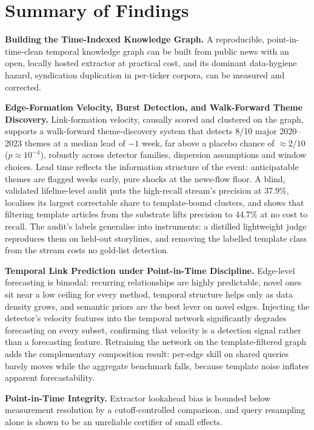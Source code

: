 \documentclass[a4paper,12pt]{report}
\begin{document}
\section{Summary of Findings}
\textbf{Building the Time-Indexed Knowledge Graph.} A reproducible,
point-in-time-clean temporal knowledge graph can be built from public news
with an open, locally hosted extractor at practical cost, and its dominant
data-hygiene hazard, syndication duplication in per-ticker corpora, can
be measured and corrected.

\textbf{Edge-Formation Velocity, Burst Detection, and Walk-Forward Theme
Discovery.} Link-formation velocity, causally scored and clustered on the graph, supports
a walk-forward theme-discovery system that detects 8/10 major 2020--2023
themes at a median lead of $-1$ week, far above a placebo chance of
$\approx 2/10$ ($p \approx 10^{-4}$), robustly across detector families,
dispersion assumptions and window choices. Lead time reflects the information
structure of the event: anticipatable themes are flagged weeks early, pure
shocks at the news-flow floor. A blind, validated lifeline-level audit puts
the high-recall stream's precision at 37.9\%, localises its largest
correctable share to template-bound clusters, and shows that filtering
template articles from the substrate lifts precision to 44.7\% at no cost
to recall. The audit's labels generalise into instruments: a distilled
lightweight judge reproduces them on held-out storylines, and removing
the labelled template class from the stream costs no gold-list
detection.

\textbf{Temporal Link Prediction under Point-in-Time Discipline.}
Edge-level forecasting is bimodal:
recurring relationships are highly predictable, novel ones sit near a low
ceiling for every method, temporal structure helps only as data density
grows, and semantic priors are the best lever on novel edges. Injecting the
detector's velocity features into the temporal network significantly
degrades forecasting on every subset, confirming that velocity is a
detection signal rather than a forecasting feature. Retraining the
network on the template-filtered graph adds the complementary
composition result: per-edge skill on shared queries barely moves while
the aggregate benchmark falls, because template noise inflates apparent
forecastability.

\textbf{Point-in-Time Integrity.} Extractor lookahead bias is bounded below
measurement resolution by a cutoff-controlled comparison, and query
resampling alone is shown to be an unreliable certifier of small effects.
\end{document}

